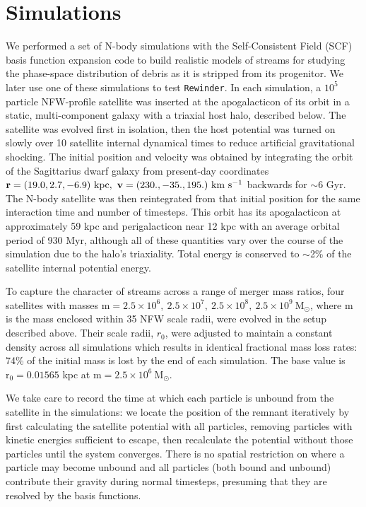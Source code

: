 \documentclass[letterpaper,12pt,preprint]{aastex}
\newcommand{\msun}{\mathrm{M}_\odot}
\newcommand{\rewinder}{\texttt{Rewinder}}
\begin{document}
\section{Simulations}\label{sec:sims}
We performed a set of N-body simulations with the Self-Consistent Field (SCF) basis function expansion code \citep{hernquist92} to build realistic models of streams for studying the phase-space distribution of debris as it is stripped from its progenitor. We later use one of these simulations to test \rewinder. In each simulation, a $10^5$ particle NFW-profile satellite was inserted at the apogalacticon of its orbit in a static, multi-component galaxy with a triaxial host halo, described below. The satellite was evolved first in isolation, then the host potential was turned on slowly over 10 satellite internal dynamical times to reduce artificial gravitational shocking. The initial position and velocity was obtained by integrating the orbit of the Sagittarius dwarf galaxy from present-day coordinates ${\bf r}  =(19.0, 2.7, -6.9)\ \mathrm{kpc}, \ {\bf v} = (230., -35., 195.) \ \mathrm{km\ s^{-1}}$ \citep{law10} backwards for $\sim$6 Gyr. The N-body satellite was then reintegrated from that initial position for the same interaction time and number of timesteps. This orbit has its apogalacticon at approximately 59 kpc and perigalacticon near 12 kpc with an average orbital period of 930 Myr, although all of these quantities vary over the course of the simulation due to the halo's triaxiality. Total energy is conserved to $\sim$2\% of the satellite internal potential energy.

To capture the character of streams across a range of merger mass ratios, four satellites with masses $\mathrm{m} = 2.5 \times 10^6,\ 2.5 \times 10^7,\ 2.5 \times 10^8,\ 2.5 \times 10^9\ \msun$, where m is the mass enclosed within 35 NFW scale radii, were evolved in the setup described above. Their scale radii, $r_0$, were adjusted to maintain a constant density across all simulations which results in identical fractional mass loss rates: 74\% of the initial mass is lost by the end of each simulation. The base value is $\mathrm{r_0}=0.01565$ kpc at $\mathrm{m} = 2.5 \times 10^6\ \msun$.

We take care to record the time at which each particle is unbound from the satellite in the simulations: we locate the position of the remnant iteratively by first calculating the satellite potential with all particles, removing particles with kinetic energies sufficient to escape, then recalculate the potential without those particles until the system converges. There is no spatial restriction on where a particle may become unbound and all particles (both bound and unbound) contribute their gravity during normal timesteps, presuming that they are resolved by the basis functions. 
\end{document}
